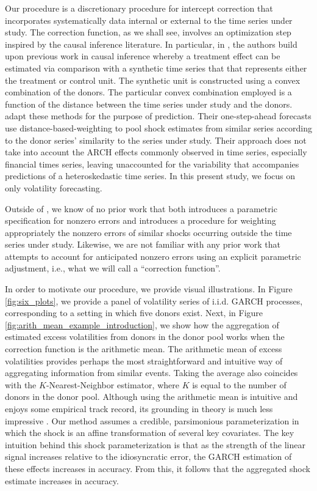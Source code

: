 \documentclass[11pt,3p,review,authoryear]{elsarticle}
\theoremstyle{definition}
\begin{document}
Our procedure is a discretionary procedure for intercept correction that  incorporates systematically data internal or external to the time series under study.  The correction function, as we shall see, involves an optimization step inspired by the causal inference literature.  In particular, in \citet{abadie2010synthetic}, the authors build upon previous work in causal inference whereby a treatment effect can be estimated via comparison with a synthetic time series that that represents either the treatment or control unit.  The synthetic unit is constructed using a convex combination of the donors.  The particular convex combination employed is a function of the distance between the time series under study and the donors.  \citet{lin2021minimizing} adapt these methods for the purpose of prediction.  Their one-step-ahead forecasts use distance-based-weighting to pool shock estimates from similar series according to the donor series' similarity to the series under study.  Their approach does not take into account the ARCH effects commonly observed in time series, especially financial times series, leaving unaccounted for the variability that accompanies predictions of a heteroskedastic time series.  In this present study, we focus on only volatility forecasting.

Outside of \citet{lin2021minimizing}, we know of no prior work that both introduces a parametric specification for nonzero errors and introduces a procedure for weighting appropriately the nonzero errors of similar shocks occurring outside the time series under study.  Likewise, we are not familiar with any prior work that attempts to account for anticipated nonzero errors using an explicit parametric adjustment, i.e., what we will call a ``correction function''.  

In order to motivate our procedure, we provide visual illustrations.  In Figure \ref{fig:six_plots}, we provide a panel of volatility series of i.i.d. GARCH processes, corresponding to a setting in which five donors exist.  Next, in Figure \ref{fig:arith_mean_example_introduction}, we show how the aggregation of estimated excess volatilities from donors in the donor pool works when the correction function is the arithmetic mean.  The arithmetic mean of excess volatilities provides perhaps the most straightforward and intuitive way of aggregating information from similar events.  Taking the average also coincides with the $K$-Nearest-Neighbor estimator, where $K$ is equal to the number of donors in the donor pool. Although using the arithmetic mean is intuitive and enjoys some empirical track record, its grounding in theory is much less impressive \citep{timmermann2006forecast}.  Our method assumes a credible, parsimonious parameterization in which the shock is an affine transformation of several key covariates.  The key intuition behind this shock parameterization is that as the strength of the linear signal increases relative to the idiosyncratic error, the GARCH estimation of these effects increases in accuracy.  From this, it follows that the aggregated shock estimate increases in accuracy.
\end{document}
